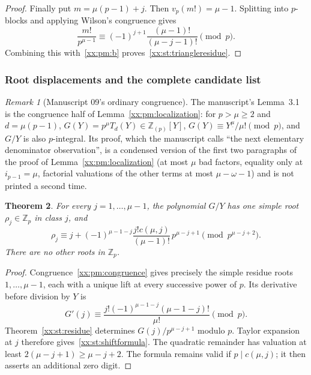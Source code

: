 \documentclass[11pt,a4paper]{article}
\numberwithin{equation}{section}
\newtheorem{theorem}{Theorem}[section]
\theoremstyle{definition}
\theoremstyle{remark}
\newtheorem{remark}[theorem]{Remark}
\theoremstyle{plain}
\newcommand{\Z}{\mathbb Z}
\newcommand{\fall}[2]{#1^{\underline{#2}}}
\begin{document}
\begin{proof}
Finally put $m=\mu(p-1)+j$. Then $v_p(m!)=\mu-1$. Splitting into $p$-blocks and
applying Wilson's congruence gives
\[
 \frac{m!}{p^{\mu-1}}\equiv
 (-1)^{j+1}\frac{(\mu-1)!}{(\mu-j-1)!}\pmod p.
\]
Combining this with~\eqref{xx:pm:b} proves~\eqref{xx:st:triangleresidue}.
\end{proof}

\subsubsection{Root displacements and the complete candidate list}

\begin{remark}[Manuscript 09's ordinary congruence]\label{xx:st:ordinary}
The manuscript's Lemma~3.1 is the congruence half of
Lemma~\ref{xx:pm:localization}: for $p>\mu\ge2$ and $d=\mu(p-1)$,
$G(Y)=p^\mu T_d(Y)\in\Z_{(p)}[Y]$, $G(Y)\equiv\fall Y\mu/\mu!\pmod p$, and $G/Y$
is also $p$-integral.  Its proof, which the manuscript calls ``the next
elementary denominator observation'', is a condensed version of the first two
paragraphs of the proof of Lemma~\ref{xx:pm:localization} (at most $\mu$ bad
factors, equality only at $i_{p-1}=\mu$, factorial valuations of the other
terms at most $\mu-\omega-1$) and is not printed a second time.
\end{remark}

\begin{theorem}\label{xx:st:shift}
For every $j=1,\ldots,\mu-1$, the polynomial $G/Y$ has one simple root
$\rho_j\in\Z_p$ in class $j$, and
\begin{equation}\label{xx:st:shiftformula}
 \rho_j\equiv j+
 (-1)^{\mu-1-j}\frac{j!c(\mu,j)}{(\mu-1)!}\,p^{\mu-j+1}
 \pmod{p^{\mu-j+2}}.
\end{equation}
There are no other roots in $\Z_p$.
\end{theorem}
\begin{proof}
Congruence~\eqref{xx:pm:congruence} gives precisely the simple residue roots
$1,\ldots,\mu-1$, each with a unique lift at every successive power of $p$. Its
derivative before division by $Y$ is
\[
 G'(j)\equiv\frac{j!(-1)^{\mu-1-j}(\mu-1-j)!}{\mu!}\pmod p.
\]
Theorem~\ref{xx:st:residue} determines $G(j)/p^{\mu-j+1}$ modulo $p$. Taylor
expansion at $j$ therefore gives~\eqref{xx:st:shiftformula}. The quadratic
remainder has valuation at least $2(\mu-j+1)\ge\mu-j+2$. The formula remains
valid if $p\mid c(\mu,j)$; it then asserts an additional zero digit.
\end{proof}
\end{document}
